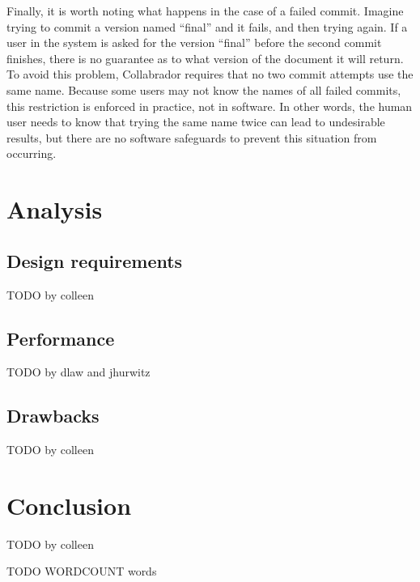 \documentclass[11pt,titlepage]{article}
\begin{document}
Finally, it is worth noting what happens in the case of a failed
commit. Imagine trying to commit a version named ``final'' and it
fails, and then trying again. If a user in the system is asked for the
version ``final'' before the second commit finishes, there is no
guarantee as to what version of the document it will return. To avoid
this problem, Collabrador requires that no two commit attempts use the
same name. Because some users may not know the names of all failed
commits, this restriction is enforced in practice, not in software. In
other words, the human user needs to know that trying the same name
twice can lead to undesirable results, but there are no software
safeguards to prevent this situation from occurring.

\section{Analysis}

\subsection{Design requirements}

TODO by colleen

\subsection{Performance}

TODO by dlaw and jhurwitz

\subsection{Drawbacks}

TODO by colleen

\section{Conclusion}

TODO by colleen

 

TODO WORDCOUNT words
\end{document}
